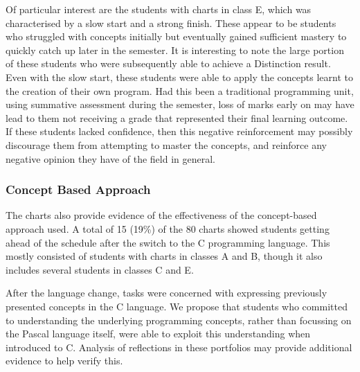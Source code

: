 Of particular interest are the students with charts in class E, which was characterised by a slow start and a strong finish. These appear to be students who struggled with concepts initially but eventually gained sufficient mastery to quickly catch up later in the semester. It is interesting to note the large portion of these students who were subsequently able to achieve a Distinction result. Even with the slow start, these students were able to apply the concepts learnt to the creation of their own program. Had this been a traditional programming unit, using summative assessment during the semester, loss of marks early on  may have lead to them not receiving a grade that represented their final learning outcome. If these students lacked confidence, then this negative reinforcement may possibly discourage them from attempting to master the concepts, and reinforce any negative opinion they have of the field in general.



\subsubsection{Concept Based Approach} %
\label{sub:use_of_multiple_languages}

The charts also provide evidence of the effectiveness of the concept-based approach used. A total of 15 (19\%) of the 80 charts showed students getting ahead of the schedule after the switch to the C programming language. This mostly consisted of students with charts in classes A and B, though it also includes several students in classes C and E. 

After the language change, tasks were concerned with expressing previously presented concepts in the C language. We propose that students who committed to understanding the underlying programming concepts, rather than focussing on the Pascal language itself, were able to exploit this understanding when introduced to C. Analysis of reflections in these portfolios may provide additional evidence to help verify this. 

